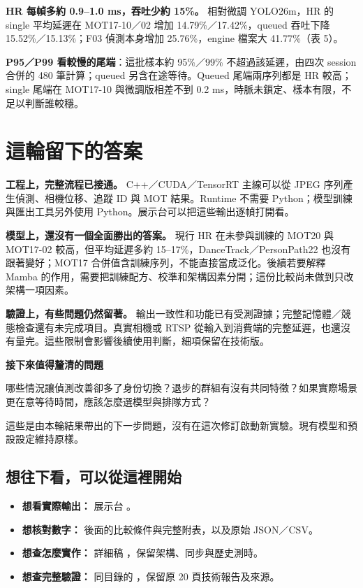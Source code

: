 \documentclass[UTF8,11pt,a4paper,fontset=none]{ctexart}
\begin{document}
\textbf{HR 每幀多約 0.9--1.0 ms，吞吐少約 15\%。} 相對微調 YOLO26m，HR 的 single 平均延遲在 MOT17-10／02 增加 14.79\%／17.42\%，queued 吞吐下降 15.52\%／15.13\%；F03 偵測本身增加 25.76\%，engine 檔案大 41.77\%（表 5）。\cite{trtcompare}

\textbf{P95／P99 看較慢的尾端}：這批樣本約 95\%／99\% 不超過該延遲，由四次 session 合併的 480 筆計算；queued 另含在途等待。Queued 尾端兩序列都是 HR 較高；single 尾端在 MOT17-10 與微調版相差不到 0.2 ms，時脈未鎖定、樣本有限，不足以判斷誰較穩。



\clearpage
\section{這輪留下的答案}
\textbf{工程上，完整流程已接通。} C++／CUDA／TensorRT 主線可以從 JPEG 序列產生偵測、相機位移、追蹤 ID 與 MOT 結果。Runtime 不需要 Python；模型訓練與匯出工具另外使用 Python。展示台可以把這些輸出逐幀打開看。\cite{reference}

\textbf{模型上，還沒有一個全面勝出的答案。} 現行 HR 在未參與訓練的 MOT20 與 MOT17-02 較高，但平均延遲多約 15--17\%，DanceTrack／PersonPath22 也沒有跟著變好；MOT17 合併值含訓練序列，不能直接當成泛化。後續若要解釋 Mamba 的作用，需要把訓練配方、校準和架構因素分開；這份比較尚未做到只改架構一項因素。\cite{primary156,trtcompare}

\textbf{驗證上，有些問題仍然留著。} 輸出一致性和功能已有受測證據；完整記憶體／競態檢查還有未完成項目。真實相機或 RTSP 從輸入到消費端的完整延遲，也還沒有量完。這些限制會影響後續使用判斷，細項保留在技術版。\cite{reference}

\begin{finding}
\textbf{接下來值得釐清的問題}\par
哪些情況讓偵測改善卻多了身份切換？退步的群組有沒有共同特徵？如果實際場景更在意等待時間，應該怎麼選模型與排隊方式？
\end{finding}

這些是由本輪結果帶出的下一步問題，沒有在這次修訂啟動新實驗。現有模型和預設設定維持原樣。

\subsection*{想往下看，可以從這裡開始}
\begin{itemize}
\item \textbf{想看實際輸出：} 展示台 。
\item \textbf{想核對數字：} 後面的比較條件與完整附表，以及原始 JSON／CSV。
\item \textbf{想查怎麼實作：} 詳細稿 ，保留架構、同步與歷史測時。
\item \textbf{想查完整驗證：} 同目錄的 ，保留原 20 頁技術報告及來源。
\end{itemize}
\end{document}

